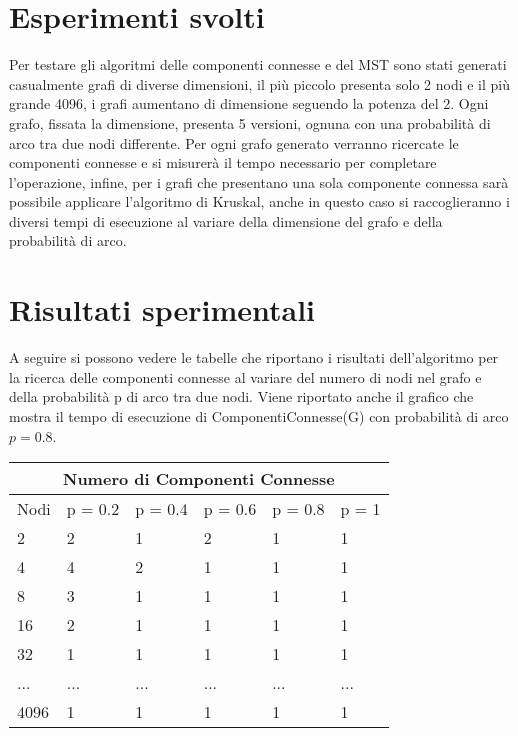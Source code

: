 \documentclass{article}
\begin{document}
\section{Esperimenti svolti}
Per testare gli algoritmi delle componenti connesse e del MST sono stati generati casualmente grafi di diverse dimensioni, il più piccolo presenta solo 2 nodi e il più grande 4096, i grafi aumentano di dimensione seguendo la potenza del 2. Ogni grafo, fissata la dimensione, presenta 5 versioni, ognuna con una probabilità di arco tra due nodi differente. Per ogni grafo generato verranno ricercate le componenti connesse e si misurerà il tempo necessario per completare l'operazione, infine, per i grafi che presentano una sola componente connessa sarà possibile applicare l'algoritmo di Kruskal, anche in questo caso si raccoglieranno i diversi tempi di esecuzione al variare della dimensione del grafo e della probabilità di arco. 

\section{Risultati sperimentali}

A seguire si possono vedere le tabelle che riportano i risultati dell'algoritmo per la ricerca delle componenti connesse al variare del numero di nodi nel grafo e della probabilità  p di arco tra due nodi. Viene riportato anche il grafico che mostra il tempo di esecuzione di ComponentiConnesse(G) con probabilità di arco $p = 0.8$. 

\begin{tabular}{ |p{1.5cm}|p{1.5cm}|p{1.5cm}|p{1.5cm}|p{1.5cm}|p{1.5cm}| }
 \hline
 \multicolumn{6}{|c|}{Numero di Componenti Connesse} \\
 \hline
    Nodi & p = 0.2 & p = 0.4 & p = 0.6 & p = 0.8 & p = 1 \\
 \hline
    2 & 2 & 1 & 2 & 1 & 1 \\
    4 & 4 & 2 & 1 & 1 & 1 \\
    8 & 3 & 1 & 1 & 1 & 1 \\
    16 & 2 & 1 & 1 & 1 & 1\\
    32 & 1 & 1 & 1 & 1 & 1\\ 
    ... & ... & ... & ... & ... & ...\\
    4096 & 1 & 1 & 1 & 1 & 1\\
 \hline
\end{tabular}

\medskip
\end{document}
